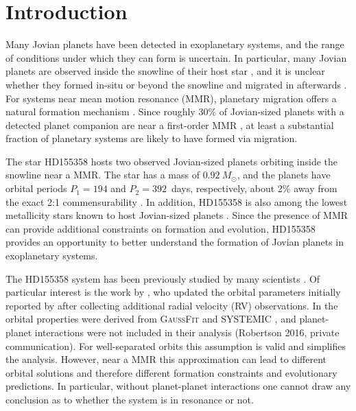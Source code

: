 \section{Introduction}
\label{sec:intro}
Many Jovian planets have been detected in exoplanetary systems, and the range of conditions under which they can form is uncertain.
In particular, many Jovian planets are observed inside the snowline of their host star \citep[e.g.][]{Hayashi1981}, and it is unclear whether they formed in-situ \citep{Boley2016, Huang2016, Batygin2016} or beyond the snowline and migrated in afterwards \citep{Mayor1995, Lin1996, Pollack1996}.
For systems near mean motion resonance (MMR), planetary migration offers a natural formation mechanism \citep[e.g.][]{Lee2002, Rein2009}.
Since roughly $30\%$ of Jovian-sized planets with a detected planet companion are near a first-order MMR \citep{Akeson2013}, at least a substantial fraction of planetary systems are likely to have formed via migration. 

The star HD155358 hosts two observed Jovian-sized planets orbiting inside the snowline near a MMR. 
The star has a mass of $0.92~M_{\odot}$, and the planets have orbital periods $P_1 = 194$ and $P_2 = 392$~days, respectively, about 2\% away from the exact 2:1 commensurability \citep[][hereafter \R]{Robertson2012}. 
In addition, HD155358 is also among the lowest metallicity stars known to host Jovian-sized planets \citep{Cochran2007}.
Since the presence of MMR can provide additional constraints on formation and evolution, HD155358 provides an opportunity to better understand the formation of Jovian planets in exoplanetary systems.

The HD155358 system has been previously studied by many scientists \citep{Cochran2007,Fuhrmann2008,Robertson2012,Andre2016}.
Of particular interest is the work by \R, who updated the orbital parameters initially reported by \citet{Cochran2007} after collecting additional radial velocity (RV) observations.
In \R the orbital properties were derived from \textsc{GaussFit\-} \citep{Jefferys1988} and \textsc{SYSTEMIC} \citep{Meschiari2009}, and planet-planet interactions were not included in their analysis (Robertson 2016, private communication). 
For well-separated orbits this assumption is valid and simplifies the analysis.
However, near a MMR this approximation can lead to different orbital solutions and therefore different formation constraints and evolutionary predictions. 
In particular, without planet-planet interactions one cannot draw any conclusion as to whether the system is in resonance or not. 

